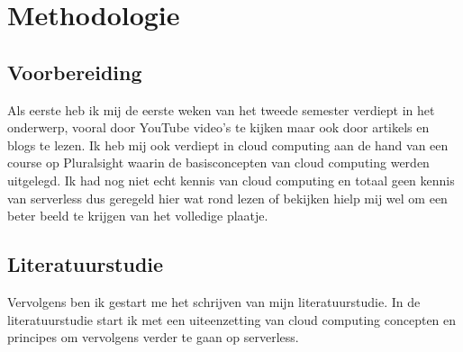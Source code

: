
\chapter{Methodologie}
\label{ch:methodologie}


\section{Voorbereiding}
Als eerste heb ik mij de eerste weken van het tweede semester verdiept in het onderwerp, vooral door YouTube video's te kijken maar ook door artikels en blogs te lezen. Ik heb mij ook  verdiept in cloud computing aan de hand van een course op Pluralsight waarin de basisconcepten van cloud computing werden uitgelegd. Ik had nog niet echt kennis van cloud computing en totaal geen kennis van serverless dus geregeld hier wat rond lezen of bekijken hielp mij wel om een beter beeld te krijgen van het volledige plaatje. 

\section{Literatuurstudie}
Vervolgens ben ik gestart me het schrijven van mijn literatuurstudie. In de literatuurstudie start ik met een uiteenzetting van cloud computing concepten en principes om vervolgens verder te gaan op serverless. 

